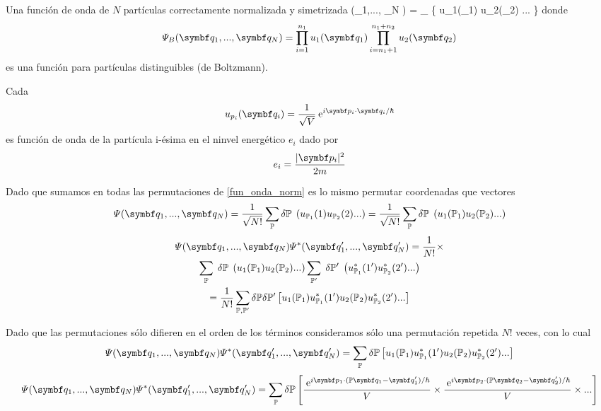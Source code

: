 \documentclass[10pt,oneside]{CBFT_book}
\begin{document}
Una función de onda de $N$ partículas correctamente normalizada y simetrizada
\be
	\Psi (_1,..., _N ) =  \sum_{  } \delta {} \; 
	\{ u_1(_1) u_2(_2) ... \}
	\label{fun_onda_norm}
\ee
{}
donde 
\[
	\Psi_B (\vb{q}_1,..., \vb{q}_N ) = \prod_{i=1}^{n_1} u_1(\vb{q}_1) \prod_{i=n_1+1}^{n_1+n_2} u_2(\vb{q}_2)
\]
es una función para partículas distinguibles (de Boltzmann).

Cada
\[
	u_{p_i}(\vb{q}_i) = \frac{1}{\sqrt{V}} \euler^{ i \vb{p}_i \cdot \vb{q}_i / \hbar }
\]
es función de onda de la partícula i-ésima en el ninvel energético $e_i$ dado por 
\[
	e_i = \frac{|\vb{p}_i|^2}{2m}
\]

Dado que sumamos en todas las permutaciones de \eqref{fun_onda_norm} es lo mismo permutar coordenadas que vectores
\[
	\Psi (\vb{q}_1,..., \vb{q}_N ) = \frac{1}{\sqrt{N!}} \sum_{ \mathbb{P} } \delta \mathbb{P} \;
	\left( u_{\mathbb{P}_1}(1) u_{\mathbb{P}_2}(2) ... \right) = 
	\frac{1}{\sqrt{N!}} \sum_{ \mathbb{P} } \delta \mathbb{P} \;
	\left( u_1({\mathbb{P}_1}) u_2({\mathbb{P}_2}) ... \right)
\]
\begin{multline*}
	\Psi (\vb{q}_1,..., \vb{q}_N ) \Psi^* (\vb{q}_1',..., \vb{q}_N' ) = \frac{1}{N!} \times \\
	\sum_{\mathbb{P}} \;  \delta \mathbb{P} \; \left(  u_1({\mathbb{P}_1}) u_2({\mathbb{P}_2}) ...\right)
	\sum_{\mathbb{P}'} \;  \delta \mathbb{P}' \; \left(  u_{\mathbb{P}_1}^*(1') u_{\mathbb{P}_2}^*(2') ... \right)\\
	= \frac{1}{N!} \sum_{\mathbb{P},\mathbb{P}'}\delta \mathbb{P} \delta \mathbb{P}'
	\left[ u_1({\mathbb{P}_1}) u_{\mathbb{P}_1}^*(1') u_2({\mathbb{P}_2}) u_{\mathbb{P}_2}^*(2') ... \right]
\end{multline*}

Dado que las permutaciones sólo difieren en el orden de los términos consideramos sólo una permutación repetida $N!$ 
veces, con lo cual 
\[
	\Psi (\vb{q}_1,..., \vb{q}_N ) \Psi^* (\vb{q}_1',..., \vb{q}_N' ) =
	\sum_{\mathbb{P}} \delta \mathbb{P} 
	\left[ u_1({\mathbb{P}_1}) u_{\mathbb{P}_1}^*(1') u_2({\mathbb{P}_2}) u_{\mathbb{P}_2}^*(2') ... \right]
\]
\[
	\Psi (\vb{q}_1,..., \vb{q}_N ) \Psi^* (\vb{q}_1',..., \vb{q}_N' ) =
	\sum_{\mathbb{P}} \delta \mathbb{P}
	\left[ \frac{\euler^{ i \vb{p}_1 \cdot ( \mathbb{P}\vb{q}_1 - \vb{q}_1' )/\hbar} }{V} \times 
	\frac{\euler^{ i \vb{p}_2 \cdot ( \mathbb{P}\vb{q}_2 - \vb{q}_2' )/\hbar}}{V} \times ... \right]
\]
\notamargen{
\[
	\delta \mathbb{P} = \begin{cases}
	                     1 \qquad \text{ bosones } \\
	                     \pm 1 \qquad \text{ fermiones}\\
	                     \text{ (perm par o impar) }
	                    \end{cases}
\]}
\end{document}
